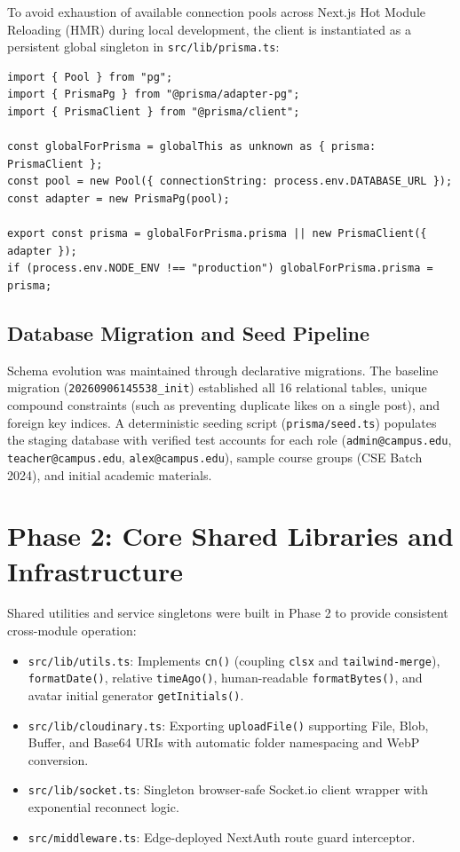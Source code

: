 \documentclass[11pt,a4paper]{report}
\begin{document}
To avoid exhaustion of available connection pools across Next.js Hot Module Reloading (HMR) during local development, the client is instantiated as a persistent global singleton in \texttt{src/lib/prisma.ts}:

\begin{lstlisting}
import { Pool } from "pg";
import { PrismaPg } from "@prisma/adapter-pg";
import { PrismaClient } from "@prisma/client";

const globalForPrisma = globalThis as unknown as { prisma: PrismaClient };
const pool = new Pool({ connectionString: process.env.DATABASE_URL });
const adapter = new PrismaPg(pool);

export const prisma = globalForPrisma.prisma || new PrismaClient({ adapter });
if (process.env.NODE_ENV !== "production") globalForPrisma.prisma = prisma;
\end{lstlisting}

\subsection{Database Migration and Seed Pipeline}

Schema evolution was maintained through declarative migrations. The baseline migration (\texttt{20260906145538\_init}) established all 16 relational tables, unique compound constraints (such as preventing duplicate likes on a single post), and foreign key indices. A deterministic seeding script (\texttt{prisma/seed.ts}) populates the staging database with verified test accounts for each role (\texttt{admin@campus.edu}, \texttt{teacher@campus.edu}, \texttt{alex@campus.edu}), sample course groups (CSE Batch 2024), and initial academic materials.

\section{Phase 2: Core Shared Libraries and Infrastructure}

Shared utilities and service singletons were built in Phase 2 to provide consistent cross-module operation:

\begin{itemize}
    \item \texttt{src/lib/utils.ts}: Implements \texttt{cn()} (coupling \texttt{clsx} and \texttt{tailwind-merge}), \texttt{formatDate()}, relative \texttt{timeAgo()}, human-readable \texttt{formatBytes()}, and avatar initial generator \texttt{getInitials()}.
    \item \texttt{src/lib/cloudinary.ts}: Exporting \texttt{uploadFile()} supporting File, Blob, Buffer, and Base64 URIs with automatic folder namespacing and WebP conversion.
    \item \texttt{src/lib/socket.ts}: Singleton browser-safe Socket.io client wrapper with exponential reconnect logic.
    \item \texttt{src/middleware.ts}: Edge-deployed NextAuth route guard interceptor.
\end{itemize}
\end{document}
